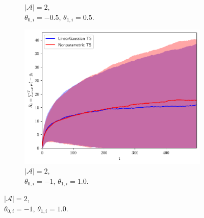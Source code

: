 \begin{figure}[!h]
\begin{subfigure}[b]{0.32\textwidth}
		\vspace*{-5ex}
		\caption{$|\mathcal{A}|=2$,\\ \hspace*{0.3cm}  $\theta_{0,i}=-0.5$, $\theta_{1,i}=0.5$.}
		\label{fig:linear_gaussian_A2_05}
	\end{subfigure}
	\begin{subfigure}[b]{0.32\textwidth}
		\includegraphics[width=\textwidth]{./figs/linearGaussian/cumregret_A2_-1_-1_1_1_1_1}
		\vspace*{-5ex}
		\caption{$|\mathcal{A}|=2$,\\ \hspace*{0.3cm}  $\theta_{0,i}=-1$, $\theta_{1,i}=1.0$.}
		\label{fig:linear_gaussian_A2_1}
	\end{subfigure}
	

\end{figure}
